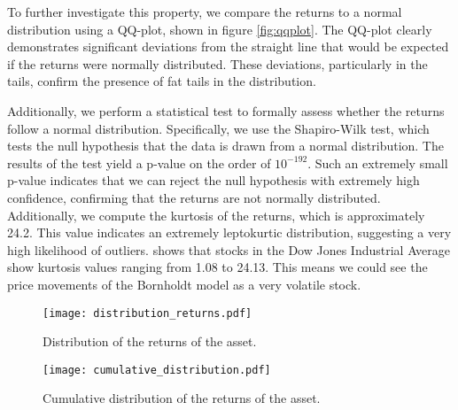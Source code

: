 To further investigate this property, we compare the returns to a normal distribution using a QQ-plot, shown in figure \ref{fig:qqplot}. The QQ-plot clearly demonstrates significant deviations from the straight line that would be expected if the returns were normally distributed. These deviations, particularly in the tails, confirm the presence of fat tails in the distribution.

Additionally, we perform a statistical test to formally assess whether the returns follow a normal distribution. Specifically, we use the Shapiro-Wilk test, which tests the null hypothesis that the data is drawn from a normal distribution. The results of the test yield a p-value on the order of $10^{-192}$. Such an extremely small p-value indicates that we can reject the null hypothesis with extremely high confidence, confirming that the returns are not normally distributed. Additionally, we compute the kurtosis of the returns, which is approximately 24.2. This value indicates an extremely leptokurtic distribution, suggesting a very high likelihood of outliers. \cite{kurtosis_skewness} shows that stocks in the Dow Jones Industrial Average show kurtosis values ranging from 1.08 to 24.13. This means we could see the price movements of the Bornholdt model as a very volatile stock.

\begin{figure}[H]
    \centering
    \begin{minipage}[T]{0.45\textwidth}
        \centering
        \texttt{[image: distribution\_returns.pdf]}
        \caption{Distribution of the returns of the asset.}
        \label{fig:returns_distribution}
    \end{minipage}
    \hfill
    \begin{minipage}[T]{0.45\textwidth}
        \centering
        \texttt{[image: cumulative\_distribution.pdf]}
        \caption{Cumulative distribution of the returns of the asset.}
        \label{fig:cumulative_returns_distribution}
    \end{minipage}
\end{figure}


